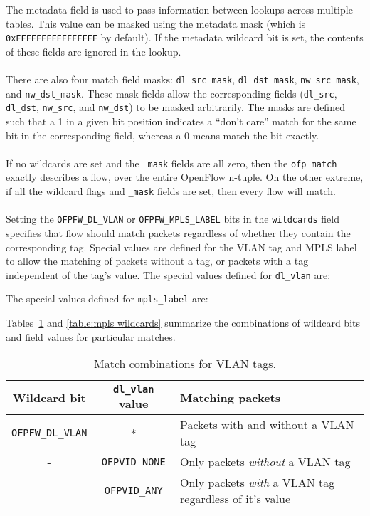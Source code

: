 

The metadata field is used to pass information between lookups across multiple tables. This value can be masked using the metadata mask (which is \verb|0xFFFFFFFFFFFFFFFF| by default). If the metadata wildcard bit is set, the contents of these fields are ignored in the lookup.
\\\\
There are also four match field masks: \verb|dl_src_mask|, \verb|dl_dst_mask|, \verb|nw_src_mask|, and \verb|nw_dst_mask|. These mask fields allow the corresponding fields (\verb|dl_src|, \verb|dl_dst|, \verb|nw_src|, and \verb|nw_dst|) to be masked arbitrarily. The masks are defined such that a 1 in a given bit position indicates a ``don't care'' match for the same bit in the corresponding field, whereas a 0 means match the bit exactly.
\\\\
If no wildcards are set and the \verb|_mask| fields are all zero, then the \verb|ofp_match| exactly describes a flow, over the entire OpenFlow n-tuple.  On the other extreme, if all the wildcard flags and \verb|_mask| fields are set, then every flow will match.
\\\\
Setting the \verb|OFPFW_DL_VLAN| or \verb|OFPFW_MPLS_LABEL| bits in the \verb|wildcards| field specifies that flow should match packets regardless of whether they contain the corresponding tag. Special values are defined for the VLAN tag and MPLS label to allow the matching of packets without a tag, or packets with a tag independent of the tag's value. The special values defined for \verb|dl_vlan| are:

The special values defined for \verb|mpls_label| are:

Tables~\ref{table:vlan wildcards} and \ref{table:mpls wildcards} summarize the combinations of wildcard bits and field values for particular matches.

\begin{table}[hbp]
\centering
\begin{tabularx}{\textwidth}{|c|c|X|}
\hline
Wildcard bit & \verb|dl_vlan| value & Matching packets \\
\hline
\verb|OFPFW_DL_VLAN| & * & Packets with and without a VLAN tag \\
\hline
- & \verb|OFPVID_NONE| & Only packets \emph{without} a VLAN tag \\
\hline
- & \verb|OFPVID_ANY| & Only packets \emph{with} a VLAN tag regardless of it's value \\
\hline
\end{tabularx}
\caption{Match combinations for VLAN tags.}
\label{table:vlan wildcards}
\end{table}

